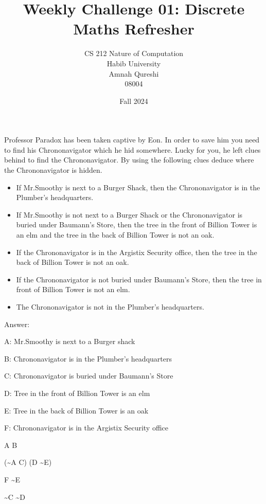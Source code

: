 \documentclass[a4paper]{exam}
\title{Weekly Challenge 01: Discrete Maths Refresher}
\author{CS 212 Nature of Computation\\Habib University\\Amnah Qureshi\\08004}
\date{Fall 2024}
\begin{document}
\maketitle

\begin{questions}
  
Professor Paradox has been taken captive by Eon. In order to save him you need to find his Chrononavigator which he hid somewhere.
Lucky for you, he left clues behind to find the Chrononavigator. By using the following clues deduce where the Chrononavigator is hidden.
\begin{itemize}
    \item If Mr.Smoothy is next to a Burger Shack, then the Chrononavigator is in the Plumber's headquarters.
    \item If Mr.Smoothy is not next to a Burger Shack or the Chrononavigator is buried under Baumann's Store, then the tree in the front of Billion Tower is an elm and the tree in the back of Billion Tower is not an oak.
    \item If the Chrononavigator is in the Argistix Security office, then the tree in the back of Billion Tower is not an oak.
    \item If the Chrononavigator is not buried under Baumann's Store, then the tree in front of Billion Tower is not an elm.
    \item The Chrononavigator is not in the Plumber's headquarters.
\end{itemize}

\begin{answer}


Answer:


A: Mr.Smoothy is next to a Burger shack


B: Chrononavigator is in the Plumber’s headquarters


C: Chrononavigator is buried under Baumann’s Store


D: Tree in the front of Billion Tower is an elm


E: Tree in the back of Billion Tower is an oak


F: Chrononavigator is in the Argistix Security office

A \rightarrow B

\;\;\; (\sim A \vee C) \rightarrow (D \wedge \sim E)

\;\;\; F \rightarrow  \sim E

\;\;\; \sim C \rightarrow  \sim D


\end{answer}
\end{questions}
\end{document}
